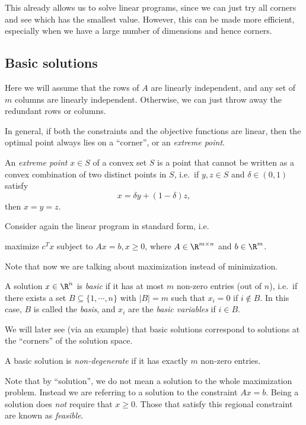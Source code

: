 \documentclass[a4paper]{article}
\begin{document}
This already allows us to solve linear programs, since we can just try all corners and see which has the smallest value. However, this can be made more efficient, especially when we have a large number of dimensions and hence corners.

\subsection{Basic solutions}
Here we will assume that the rows of $A$ are linearly independent, and any set of $m$ columns are linearly independent. Otherwise, we can just throw away the redundant rows or columns.

In general, if both the constraints and the objective functions are linear, then the optimal point always lies on a ``corner'', or an \emph{extreme point}.

\begin{defi}
  An \emph{extreme point} $x\in S$ of a convex set $S$ is a point that cannot be written as a convex combination of two distinct points in $S$, i.e.\ if $y, z\in S$ and $\delta \in (0, 1)$ satisfy
  \[
    x = \delta y + (1 - \delta) z,
  \]
  then $x = y = z$.
\end{defi}

Consider again the linear program in standard form, i.e.
\begin{center}
  maximize $c^T x$ subject to $Ax = b, x \geq 0$, where $A \in \R^{m\times n}$ and $b\in \R^m$.
\end{center}
Note that now we are talking about maximization instead of minimization.

\begin{defi}
  A solution $x\in \R^n$ is \emph{basic} if it has at most $m$ non-zero entries (out of $n$), i.e.\ if there exists a set $B\subseteq \{1, \cdots, n\}$ with $|B| = m$ such that $x_i = 0$ if $i\not\in B$. In this case, $B$ is called the \emph{basis}, and $x_i$ are the \emph{basic variables} if $i\in B$.
\end{defi}
We will later see (via an example) that basic solutions correspond to solutions at the ``corners'' of the solution space.

\begin{defi}
  A basic solution is \emph{non-degenerate} if it has exactly $m$ non-zero entries.
\end{defi}

Note that by ``solution'', we do not mean a solution to the whole maximization problem. Instead we are referring to a solution to the constraint $Ax = b$. Being a solution does \emph{not} require that $x \geq 0$. Those that satisfy this regional constraint are known as \emph{feasible}.
\end{document}
